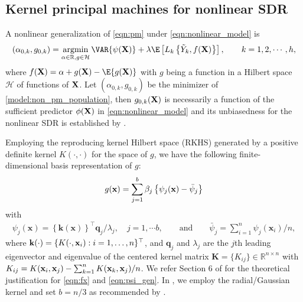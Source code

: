 \subsection{Kernel principal machines for nonlinear SDR} \label{sec:NLPSDR}

A nonlinear generalization of \eqref{eqn:pm} under \eqref{eqn:nonlinear_model} is
\begin{equation}\label{model:non_pm_population}
(\alpha_{0,k}, g_{0,k}) = \argmin_{\alpha \in \mathbb{R}, g \in \mathcal{H}} \VAR \{\psi(\bX)\}+\lambda \E\left[ {L}_k \left\{ \tilde{Y}_{k}, f(\bX) \right\} \right], \qquad k = 1, 2, \cdots, h,
\end{equation}
where $f(\bX)=\alpha+g(\bX)-\E\{g(\bX)\}$ with $g$ being a function in a Hilbert space $\mathcal{H}$ of functions of $\mathbf{X}$. 
Let $(\alpha_{0,k}, g_{0,k})$ be the minimizer of \eqref{model:non_pm_population}, then $g_{0,k}(\mathbf{X})$ is necessarily a function of the sufficient predictor $\phi(\mathbf{X})$ in \eqref{eqn:nonlinear_model} and its unbiasedness for the nonlinear SDR is established by \citet{Li2011::psvm}.

Employing the reproducing kernel Hilbert space (RKHS) generated by a positive definite kernel $K(\cdot, \cdot)$ for the space of $g$, we have the following finite-dimensional basis representation of $g$:
\begin{align}\label{eqn:fx}
g(\mathbf{x}) = \sum_{j=1}^b \beta_j \left\{\psi_{j}(\mathbf{x})- \bar \psi_j \right\}
\end{align}
with 
\begin{align}\label{eqn:psi_gen}
\psi_j(\mathbf{x})=\left\{\mathbf{k}(\mathbf{x})\right\}^{\top} \mathbf{q}_j / \lambda_j, \quad j=1, \cdots b, \qquad \mbox{and} \qquad \bar \psi_j = \sum_{i=1}^{n}\psi_{j}\left(\mathbf{x}_{i}\right)/n,
\end{align}
where $\mathbf{k}(\cdot)=\{K(\cdot, \mathbf{x}_i) : i=1,\ldots,n\}^{\top}$, and $\mathbf{q}_j$ and $\lambda_j$ are the $j$th leading eigenvector and eigenvalue of the centered kernel matrix $\mathbf{K} = \{K_{ij}\} \in \mathbb{R}^{n\times n}$ with $K_{ij} = K(\mathbf{x}_i, \mathbf{x}_j) - \sum_{k = 1}^n K(\mathbf{x}_k, \mathbf{x}_j)/n$. We refer Section 6 of \citet{Li2011::psvm} for the theoretical justification for \eqref{eqn:fx} and \eqref{eqn:psi_gen}.  In , we employ the radial/Gaussian kernel and set $b = n/3$ as recommended by \citet{Li2011::psvm}. 

